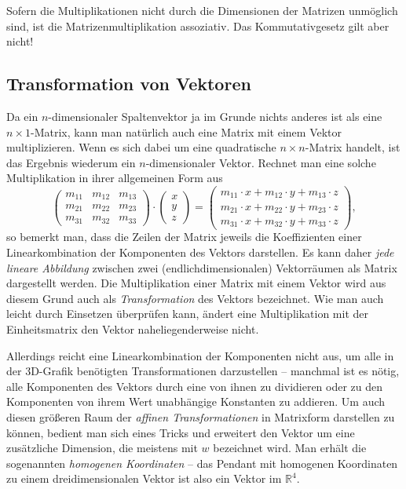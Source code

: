 Sofern die Multiplikationen nicht durch die Dimensionen der Matrizen unmöglich sind, ist die Matrizenmultiplikation assoziativ. Das Kommutativgesetz gilt aber nicht! 

\subsection{Transformation von Vektoren}
\label{vectortransformation}
Da ein $n$-dimensionaler Spaltenvektor ja im Grunde nichts anderes ist als eine $n \times 1$-Matrix, kann man natürlich auch eine Matrix mit einem Vektor multiplizieren. Wenn es sich dabei um eine quadratische $n \times n$-Matrix handelt, ist das Ergebnis wiederum ein $n$-dimensionaler Vektor. Rechnet man eine solche Multiplikation in ihrer allgemeinen Form aus
\begin{equation}
 \begin{pmatrix}
  m_{11} & m_{12} & m_{13} \\
  m_{21} & m_{22} & m_{23} \\
  m_{31} & m_{32} & m_{33}
 \end{pmatrix} \cdot
 \begin{pmatrix}
  x \\ y \\ z
 \end{pmatrix} =
 \begin{pmatrix}
  m_{11} \cdot x + m_{12} \cdot y + m_{13} \cdot z \\
  m_{21} \cdot x + m_{22} \cdot y + m_{23} \cdot z \\
  m_{31} \cdot x + m_{32} \cdot y + m_{33} \cdot z
 \end{pmatrix},
\end{equation}
so bemerkt man, dass die Zeilen der Matrix jeweils die Koeffizienten einer Linearkombination der Komponenten des Vektors darstellen. Es kann daher \emph{jede lineare Abbildung} zwischen zwei (endlichdimensionalen) Vektorräumen als Matrix dargestellt werden. Die Multiplikation einer Matrix mit einem Vektor wird aus diesem Grund auch als \emph{Transformation} des Vektors bezeichnet. Wie man auch leicht durch Einsetzen überprüfen kann, ändert eine Multiplikation mit der Einheitsmatrix den Vektor naheliegenderweise nicht.

\label{homogeneouscoordinates}
Allerdings reicht eine Linearkombination der Komponenten nicht aus, um alle in der 3D-Grafik benötigten Transformationen darzustellen -- manchmal ist es nötig, alle Komponenten des Vektors durch eine von ihnen zu dividieren oder zu den Komponenten von ihrem Wert unabhängige Konstanten zu addieren. Um auch diesen größeren Raum der \emph{affinen Transformationen} in Matrixform darstellen zu können, bedient man sich eines Tricks und erweitert den Vektor um eine zusätzliche Dimension, die meistens mit $w$ bezeichnet wird. Man erhält die sogenannten \emph{homogenen Koordinaten} -- das Pendant mit homogenen Koordinaten zu einem dreidimensionalen Vektor ist also ein Vektor im $\mathbb{R}^4$.

